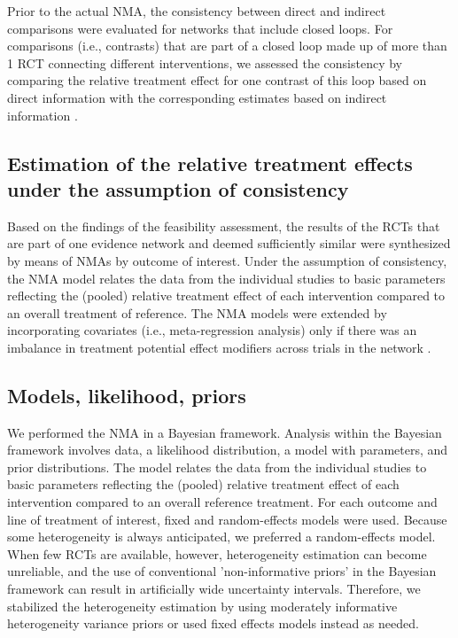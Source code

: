 \documentclass[11pt,final,fleqn]{article}\usepackage[]{graphicx}\usepackage[]{color}
\theoremstyle{plain}
\begin{document}
{\begin{appendices}
Prior to the actual NMA, the consistency between direct and indirect comparisons were evaluated for networks that include closed loops. For comparisons (i.e., contrasts) that are part of a closed loop made up of more than 1 RCT connecting different interventions, we assessed the consistency by comparing the relative treatment effect for one contrast of this loop based on direct information with the corresponding estimates based on indirect information \citep{dias2018network}.

\subsection{Estimation of the relative treatment effects under the assumption of consistency}

Based on the findings of the feasibility assessment, the results of the RCTs that are part of one evidence network and deemed sufficiently similar were synthesized by means of NMAs by outcome of interest. Under the assumption of consistency, the NMA model relates the data from the individual studies to basic parameters reflecting the (pooled) relative treatment effect of each intervention compared to an overall treatment of reference. The NMA models were extended by incorporating covariates (i.e., meta-regression analysis) only if there was an imbalance in treatment potential effect modifiers across trials in the network \citep{dias2018network}. 

\subsection{Models, likelihood, priors}

We performed the NMA in a Bayesian framework.  Analysis within the Bayesian framework involves data, a likelihood distribution, a model with parameters, and prior distributions.  The model relates the data from the individual studies to basic parameters reflecting the (pooled) relative treatment effect of each intervention compared to an overall reference treatment.  For each outcome and line of treatment of interest, fixed and random-effects models were used.  Because some heterogeneity is always anticipated, we preferred a random-effects model.  When few RCTs are available, however, heterogeneity estimation can become unreliable, and the use of conventional 'non-informative priors' in the Bayesian framework can result in artificially wide uncertainty intervals.  Therefore, we stabilized the heterogeneity estimation by using moderately informative heterogeneity variance priors or used fixed effects models instead as needed.


\end{appendices}}
\end{document}
